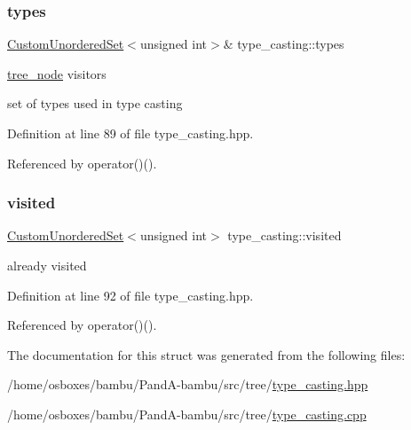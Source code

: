 \subsubsection{\texorpdfstring{types}{types}}
{\footnotesize\ttfamily \hyperlink{classCustomUnorderedSet}{Custom\+Unordered\+Set}$<$unsigned int$>$\& type\+\_\+casting\+::types\hspace{0.3cm}{\ttfamily [private]}}



\hyperlink{classtree__node}{tree\+\_\+node} visitors 

set of types used in type casting 

Definition at line 89 of file type\+\_\+casting.\+hpp.



Referenced by operator()().

\mbox{\label{structtype__casting_ac4fcdb1776a326d10eb4c3d76b682dd3}} 
\subsubsection{\texorpdfstring{visited}{visited}}
{\footnotesize\ttfamily \hyperlink{classCustomUnorderedSet}{Custom\+Unordered\+Set}$<$unsigned int$>$ type\+\_\+casting\+::visited\hspace{0.3cm}{\ttfamily [private]}}



already visited 



Definition at line 92 of file type\+\_\+casting.\+hpp.



Referenced by operator()().



The documentation for this struct was generated from the following files\+:\begin{DoxyCompactItemize}
\item 
/home/osboxes/bambu/\+Pand\+A-\/bambu/src/tree/\hyperlink{type__casting_8hpp}{type\+\_\+casting.\+hpp}\item 
/home/osboxes/bambu/\+Pand\+A-\/bambu/src/tree/\hyperlink{type__casting_8cpp}{type\+\_\+casting.\+cpp}\end{DoxyCompactItemize}
